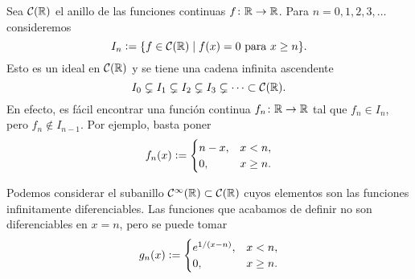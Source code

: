 \begin{ejemplo}
  Sea $\mathcal{C} (\mathbb{R})$ el anillo de las funciones continuas
  $f\colon \mathbb{R}\to \mathbb{R}$. Para $n = 0,1,2,3,\ldots$ consideremos
  $$I_n \mathrel{\mathop:}= \{ f\in \mathcal{C} (\mathbb{R}) \mid f (x) = 0 \text{ para }x \ge n \}.$$
  Esto es un ideal en $\mathcal{C} (\mathbb{R})$ y se tiene una cadena infinita
  ascendente
  \[ I_0 \subsetneq I_1 \subsetneq I_2 \subsetneq I_3 \subsetneq \cdots \subset
     \mathcal{C} (\mathbb{R}). \]
  En efecto, es fácil encontrar una función continua $f_n\colon \mathbb{R}\to \mathbb{R}$ tal
  que $f_n\in I_n$, pero $f_n\notin I_{n-1}$. Por ejemplo, basta poner
  $$f_n (x) \mathrel{\mathop:}= \begin{cases}
    n-x, & x < n, \\
    0, & x \ge n.
  \end{cases}$$

  \begin{center}
  \end{center}

  Podemos considerar el subanillo
  $\mathcal{C}^\infty (\mathbb{R}) \subset \mathcal{C} (\mathbb{R})$ cuyos elementos son las
  funciones infinitamente diferenciables. Las funciones que acabamos de definir
  no son diferenciables en $x = n$, pero se puede tomar
  $$g_n (x) \mathrel{\mathop:}= \begin{cases}
    e^{1/(x-n)}, & x < n, \\
    0, & x \ge n.
  \end{cases}$$

  \begin{center}
\end{center}
\end{ejemplo}
